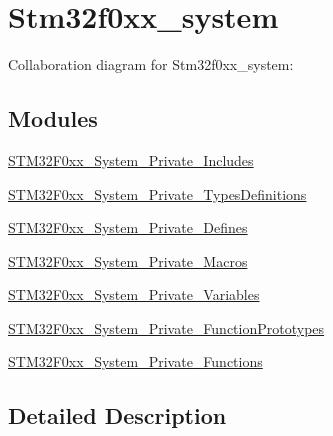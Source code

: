 \hypertarget{group__stm32f0xx__system}{}\section{Stm32f0xx\+\_\+system}
\label{group__stm32f0xx__system}
Collaboration diagram for Stm32f0xx\+\_\+system\+:
\subsection*{Modules}
\begin{DoxyCompactItemize}
\item 
\hyperlink{group___s_t_m32_f0xx___system___private___includes}{S\+T\+M32\+F0xx\+\_\+\+System\+\_\+\+Private\+\_\+\+Includes}
\item 
\hyperlink{group___s_t_m32_f0xx___system___private___types_definitions}{S\+T\+M32\+F0xx\+\_\+\+System\+\_\+\+Private\+\_\+\+Types\+Definitions}
\item 
\hyperlink{group___s_t_m32_f0xx___system___private___defines}{S\+T\+M32\+F0xx\+\_\+\+System\+\_\+\+Private\+\_\+\+Defines}
\item 
\hyperlink{group___s_t_m32_f0xx___system___private___macros}{S\+T\+M32\+F0xx\+\_\+\+System\+\_\+\+Private\+\_\+\+Macros}
\item 
\hyperlink{group___s_t_m32_f0xx___system___private___variables}{S\+T\+M32\+F0xx\+\_\+\+System\+\_\+\+Private\+\_\+\+Variables}
\item 
\hyperlink{group___s_t_m32_f0xx___system___private___function_prototypes}{S\+T\+M32\+F0xx\+\_\+\+System\+\_\+\+Private\+\_\+\+Function\+Prototypes}
\item 
\hyperlink{group___s_t_m32_f0xx___system___private___functions}{S\+T\+M32\+F0xx\+\_\+\+System\+\_\+\+Private\+\_\+\+Functions}
\end{DoxyCompactItemize}


\subsection{Detailed Description}

